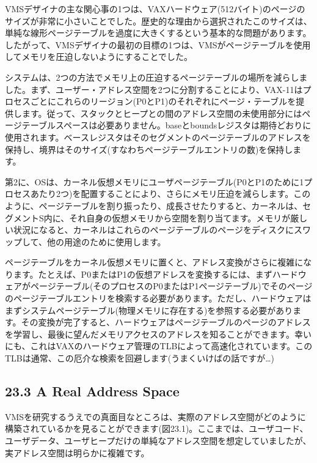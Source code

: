 VMSデザイナの主な関心事の1つは、VAXハードウェア(512バイト)のページのサイズが非常に小さいことでした。歴史的な理由から選択されたこのサイズは、単純な線形ページテーブルを過度に大きくするという基本的な問題があります。したがって、VMSデザイナの最初の目標の1つは、VMSがページテーブルを使用してメモリを圧迫しないようにすることでした。

システムは、2つの方法でメモリ上の圧迫するページテーブルの場所を減らしました。まず、ユーザー・アドレス空間を2つに分割することにより、VAX-11はプロセスごとにこれらのリージョン(P0とP1)のそれぞれにページ・テーブルを提供します。従って、スタックとヒープとの間のアドレス空間の未使用部分にはページテーブルスペースは必要ありません。baseとboundsレジスタは期待どおりに使用されます。ベースレジスタはそのセグメントのページテーブルのアドレスを保持し、境界はそのサイズ(すなわちページテーブルエントリの数)を保持します。

第2に、OSは、カーネル仮想メモリにユーザページテーブル(P0とP1のために1プロセスあたり2つ)を配置することにより、さらにメモリ圧迫を減らします。このように、ページテーブルを割り振ったり、成長させたりすると、カーネルは、セグメントS内に、それ自身の仮想メモリから空間を割り当てます。メモリが厳しい状況になると、カーネルはこれらのページテーブルのページをディスクにスワップして、他の用途のために使用します。

ページテーブルをカーネル仮想メモリに置くと、アドレス変換がさらに複雑になります。たとえば、P0またはP1の仮想アドレスを変換するには、まずハードウェアがページテーブル(そのプロセスのP0またはP1ページテーブル)でそのページのページテーブルエントリを検索する必要があります。ただし、ハードウェアはまずシステムページテーブル(物理メモリに存在する)を参照する必要があります。その変換が完了すると、ハードウェアはページテーブルのページのアドレスを学習し、最後に望んだメモリアクセスのアドレスを知ることができます。幸いにも、これはVAXのハードウェア管理のTLBによって高速化されています。このTLBは通常、この厄介な検索を回避します(うまくいけばの話ですが\ldots)

\hypertarget{a-real-address-space}{%
\subsection*{23.3 A Real Address Space}\label{a-real-address-space}}

VMSを研究するうえでの真面目なところは、実際のアドレス空間がどのように構築されているかを見ることができます(図23.1)。ここまでは、ユーザコード、ユーザデータ、ユーザヒープだけの単純なアドレス空間を想定していましたが、実アドレス空間は明らかに複雑です。


